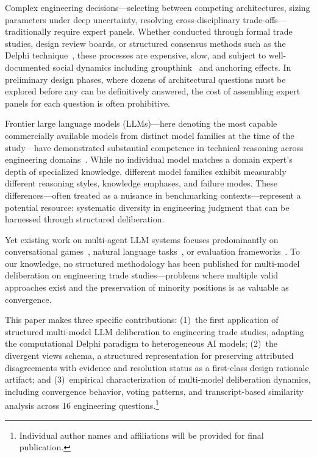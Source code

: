\documentclass[11pt,a4paper]{article}
\begin{document}
Complex engineering decisions---selecting between competing architectures, sizing parameters under deep uncertainty, resolving cross-disciplinary trade-offs---traditionally require expert panels. Whether conducted through formal trade studies, design review boards, or structured consensus methods such as the Delphi technique~\cite{linstone1975delphi}, these processes are expensive, slow, and subject to well-documented social dynamics including groupthink~\cite{janis1982groupthink} and anchoring effects. In preliminary design phases, where dozens of architectural questions must be explored before any can be definitively answered, the cost of assembling expert panels for each question is often prohibitive.

Frontier large language models (LLMs)---here denoting the most capable commercially available models from distinct model families at the time of the study---have demonstrated substantial competence in technical reasoning across engineering domains~\cite{bubeck2023sparks,openai2024gpt4}. While no individual model matches a domain expert's depth of specialized knowledge, different model families exhibit measurably different reasoning styles, knowledge emphases, and failure modes. These differences---often treated as a nuisance in benchmarking contexts---represent a potential resource: systematic diversity in engineering judgment that can be harnessed through structured deliberation.

Yet existing work on multi-agent LLM systems focuses predominantly on conversational games~\cite{du2023debate}, natural language tasks~\cite{wu2023autogen}, or evaluation frameworks~\cite{zheng2024judging}. To our knowledge, no structured methodology has been published for multi-model deliberation on engineering trade studies---problems where multiple valid approaches exist and the preservation of minority positions is as valuable as convergence.

This paper makes three specific contributions: (1)~the first application of structured multi-model LLM deliberation to engineering trade studies, adapting the computational Delphi paradigm to heterogeneous AI models; (2)~the divergent views schema, a structured representation for preserving attributed disagreements with evidence and resolution status as a first-class design rationale artifact; and (3)~empirical characterization of multi-model deliberation dynamics, including convergence behavior, voting patterns, and transcript-based similarity analysis across 16 engineering questions.\footnote{Individual author names and affiliations will be provided for final publication.}
\end{document}
